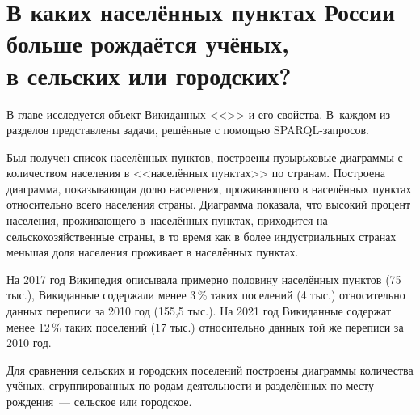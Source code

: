 \chapter[В каких населённых пунктах России больше рождаётся учёных, в сельских или городских?]{В каких населённых пунктах России больше рождаётся учёных,\\в сельских или городских?}
\label{ch:human-settlement}

В главе исследуется объект Викиданных <<>> и его свойства. 
В~каждом из разделов представлены задачи, решённые с помощью SPARQL-запросов. 
%

Был получен список населённых пунктов, 
построены пузырьковые диаграммы с количеством населения в <<населённых пунктах>> по странам. 
Построена диаграмма, показывающая долю населения, 
проживающего в населённых пунктах относительно всего населения страны. 
Диаграмма показала, что высокий процент населения, проживающего в~населённых пунктах, 
приходится на сельскохозяйственные страны, в то время как в более индустриальных странах 
меньшая доля населения проживает в населённых пунктах. 
%

На 2017 год Википедия описывала примерно половину населённых пунктов (75 тыс.), 
Викиданные содержали менее 3\,\% таких поселений (4 тыс.) относительно данных переписи за 2010 год (155,5 тыс.). 
На 2021 год Викиданные содержат менее 12\,\% таких поселений (17 тыс.) 
относительно данных той же переписи за 2010 год. 

Для сравнения сельских и городских поселений 
построены диаграммы количества учёных, сгруппированных по родам деятельности 
и разделённых по месту рождения~--- сельское или городское.

